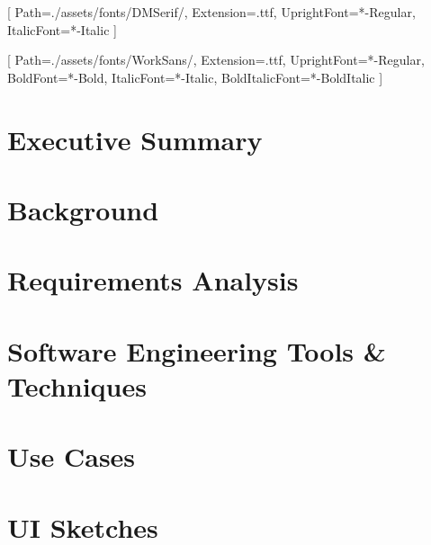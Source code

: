 

\setmainfont{DMSerifDisplay}[
    Path=./assets/fonts/DMSerif/,
    Extension=.ttf,
    UprightFont=*-Regular,
    ItalicFont=*-Italic
]

\setsansfont{WorkSans}[
    Path=./assets/fonts/WorkSans/,
    Extension=.ttf,
    UprightFont=*-Regular,
    BoldFont=*-Bold,
    ItalicFont=*-Italic,
    BoldItalicFont=*-BoldItalic
]

\setlststylejs





\newpage

\section{Executive Summary}

\textsf{}

\section{Background}

\textsf{}

\section{Requirements Analysis}

\textsf{}

\textsf{}

\textsf{}

\section{Software Engineering Tools \& Techniques}

\textsf{}

\textsf{}

\textsf{}

\textsf{}

\textsf{}

\appendix

\section{Use Cases}

\textsf{}

\section{UI Sketches}

\textsf{}


